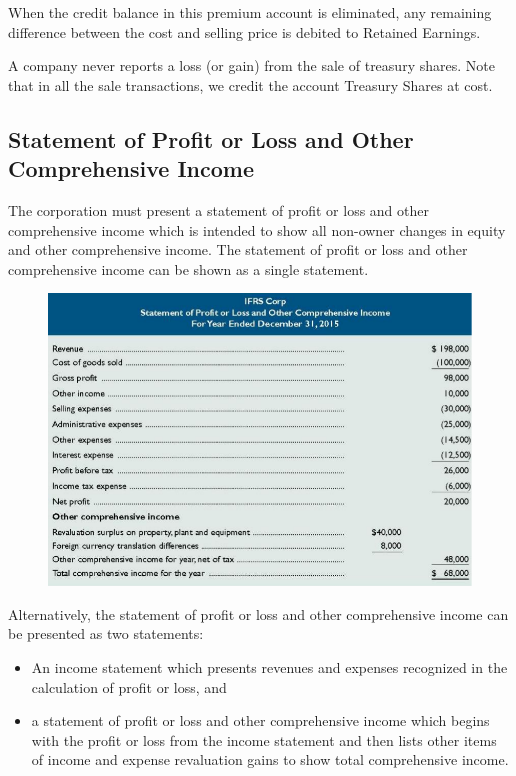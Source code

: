 \documentclass[../main.tex]{subfiles}
\begin{document}
	When the credit balance in this premium account is eliminated, any 
	remaining difference between the cost and selling price is debited to 
	Retained Earnings.
	
	A company never reports a loss (or gain) from the sale of treasury shares. 
	Note that in all the sale transactions, we credit the account Treasury 
	Shares at cost.
	
	\subsection{Statement of Profit or Loss and Other Comprehensive Income}
	
	The corporation must present a statement of profit or loss and other 
	comprehensive income which is intended to show  all non-owner changes in 
	equity and other comprehensive income. The statement of profit or loss and 
	other comprehensive income can be shown as a single statement. 
	
	\begin{figure}[ht]
		\centering
		\includegraphics[width=1\columnwidth]{images/c9/statement_comprehensive.png}
	\end{figure}
	
	Alternatively, the  statement of profit or loss and other comprehensive 
	income can be presented as two statements: 
	\begin{itemize}[noitemsep]
		\item An income statement which 
		presents revenues and expenses recognized in the calculation of profit 
		or loss, and
		\item a statement of profit or loss and other comprehensive income 
		which begins with the profit or loss from the income statement and then 
		lists other items of income and expense \eg revaluation gains to 
		show total  comprehensive income.
	\end{itemize}
	
\end{document}
